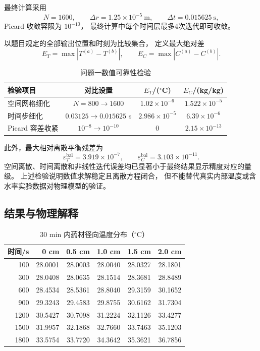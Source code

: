 \documentclass[UTF8,a4paper,11pt]{ctexart}
\begin{document}
最终计算采用
\[
N=1600,
\qquad
\Delta r=1.25\times10^{-5}\ \mathrm m,
\qquad
\Delta t=0.015625\ \mathrm s,
\]
Picard 收敛容限为 $10^{-10}$，
最终计算中每个时间层最多4次迭代即可收敛。

以题目规定的全部输出位置和时刻为比较集合，
定义最大绝对差
\[
E_T=\max|T^{(a)}-T^{(b)}|,
\qquad
E_C=\max|C^{(a)}-C^{(b)}|.
\]

\begin{table}[H]
\centering
\caption{问题一数值可靠性检验}
\begin{tabular}{lccc}
\toprule
检验项目 & 对比设置 & $E_T$/($^\circ$C) & $E_C$/(kg/kg)\\
\midrule
空间网格细化 &
$N=800\rightarrow1600$ &
$1.02\times10^{-6}$ &
$1.522\times10^{-5}$\\
时间步细化 &
$0.03125\rightarrow0.015625$ s &
$2.986\times10^{-5}$ &
$6.39\times10^{-6}$\\
Picard 容差收紧 &
$10^{-8}\rightarrow10^{-10}$ &
$0$ &
$2.15\times10^{-13}$\\
\bottomrule
\end{tabular}
\end{table}

此外，最大相对离散平衡残差为
\[
\varepsilon_T^{\mathrm{bal}}
=3.919\times10^{-7},
\qquad
\varepsilon_C^{\mathrm{bal}}
=3.103\times10^{-11}.
\]
空间离散、时间离散和非线性迭代误差均已显著小于最终结果显示精度对应的量级。
上述检验说明数值求解稳定且离散方程闭合，
但不能替代真实内部温度或含水率实验数据对物理模型的验证。

\subsection{结果与物理解释}

\begin{table}[H]
\centering
\caption{30 min 内药材径向温度分布（$^\circ$C）}
\begin{tabular}{rrrrrr}
\toprule
时间/s & 0 cm & 0.5 cm & 1.0 cm & 1.5 cm & 2.0 cm\\
\midrule
100  & 28.0001 & 28.0003 & 28.0040 & 28.0327 & 28.1801\\
300  & 28.0408 & 28.0635 & 28.1514 & 28.3681 & 28.8489\\
600  & 28.4534 & 28.5361 & 28.8040 & 29.3159 & 30.1652\\
900  & 29.3243 & 29.4583 & 29.8755 & 30.6162 & 31.7304\\
1200 & 30.5427 & 30.7098 & 31.2224 & 32.1126 & 33.4277\\
1500 & 31.9957 & 32.1868 & 32.7660 & 33.7463 & 35.1203\\
1800 & 33.5754 & 33.7720 & 34.3642 & 35.3621 & 36.7856\\
\bottomrule
\end{tabular}
\end{table}
\end{document}
